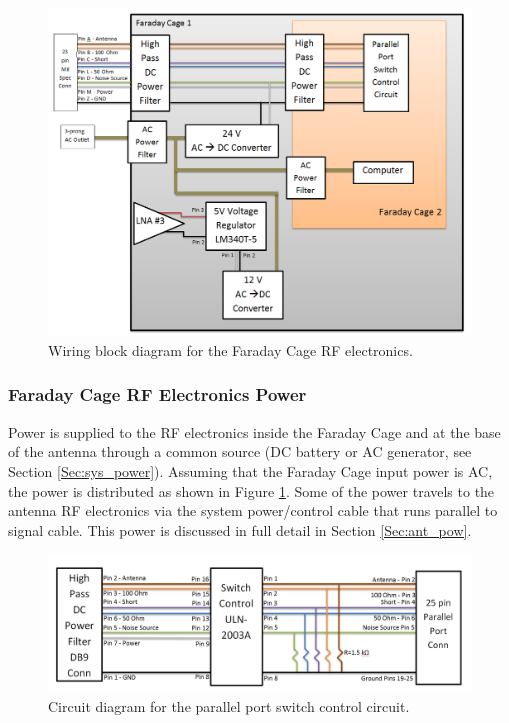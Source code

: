 \begin{figure}[htb]
\begin{center}
\includegraphics[width=0.9\linewidth]{SCIHI_system/figures/fcage_rf_power_block_diagram.png}
\caption{Wiring block diagram for the Faraday Cage RF electronics.}
\label{Fig:fcage_RF_pow_block_diagram}
\end{center}
\end{figure}

\subsubsection{Faraday Cage RF Electronics Power}

Power is supplied to the RF electronics inside the Faraday Cage and at the base of the antenna through a common source (DC battery or AC generator, see Section \ref{Sec:sys_power}). Assuming that the Faraday Cage input power is AC, the power is distributed as shown in Figure \ref{Fig:fcage_RF_pow_block_diagram}. Some of the power travels to the antenna RF electronics via the system power/control cable that runs parallel to signal cable. This power is discussed in full detail in Section \ref{Sec:ant_pow}. 

\begin{figure}[htb]
\begin{center}
\includegraphics[width=0.9\linewidth]{SCIHI_system/figures/fcage_pp_con_circuit_diagram.png}
\caption{Circuit diagram for the parallel port switch control circuit.}
\label{Fig:fcage_ppcon_block_diagram}
\end{center}
\end{figure}


